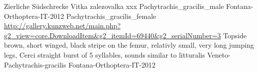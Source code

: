 {Zierliche S\"udschrecke} %
{Vitka zalezovalka} %
{xxx} %
{Pachytrachis_gracilis_male} %
{Fontana-Orthoptera-IT-2012}%
{Pachytrachis_gracilis_female} %
{\url{http://gallery.kunzweb.net/main.php?g2_view=core.DownloadItem&g2_itemId=69440&g2_serialNumber=3}} %
{Topside brown, short winged, black stripe on the femur, relativly small, very long jumping legs, Cerci straight} %
{burst of 5 syllables, sounds similar to litturalis} %
{Veneto-Pachytrachis-gracilis} %
{Fontana-Orthoptera-IT-2012}%
